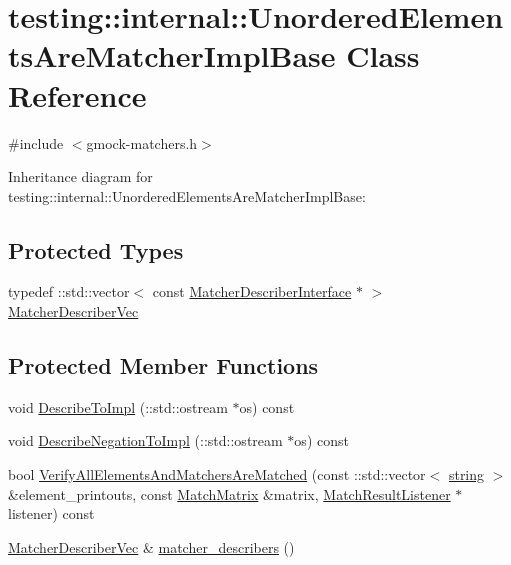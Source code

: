 \hypertarget{classtesting_1_1internal_1_1_unordered_elements_are_matcher_impl_base}{}\section{testing\+:\+:internal\+:\+:Unordered\+Elements\+Are\+Matcher\+Impl\+Base Class Reference}
\label{classtesting_1_1internal_1_1_unordered_elements_are_matcher_impl_base}


{\ttfamily \#include $<$gmock-\/matchers.\+h$>$}



Inheritance diagram for testing\+:\+:internal\+:\+:Unordered\+Elements\+Are\+Matcher\+Impl\+Base\+:
\subsection*{Protected Types}
\begin{DoxyCompactItemize}
\item 
typedef \+::std\+::vector$<$ const \hyperlink{classtesting_1_1_matcher_describer_interface}{Matcher\+Describer\+Interface} $\ast$ $>$ \hyperlink{classtesting_1_1internal_1_1_unordered_elements_are_matcher_impl_base_a81ca7ce793d4b25ce2a7d3e28b48cd64}{Matcher\+Describer\+Vec}
\end{DoxyCompactItemize}
\subsection*{Protected Member Functions}
\begin{DoxyCompactItemize}
\item 
void \hyperlink{classtesting_1_1internal_1_1_unordered_elements_are_matcher_impl_base_a025abc723fc4f2788c81eb1eca3838e9}{Describe\+To\+Impl} (\+::std\+::ostream $\ast$os) const 
\item 
void \hyperlink{classtesting_1_1internal_1_1_unordered_elements_are_matcher_impl_base_a40998516ce516b79f99db299c58b8231}{Describe\+Negation\+To\+Impl} (\+::std\+::ostream $\ast$os) const 
\item 
bool \hyperlink{classtesting_1_1internal_1_1_unordered_elements_are_matcher_impl_base_a0a12446ecc8fab75a551a77c322e7896}{Verify\+All\+Elements\+And\+Matchers\+Are\+Matched} (const \+::std\+::vector$<$ \hyperlink{namespacetesting_1_1internal_a8e8ff5b11e64078831112677156cb111}{string} $>$ \&element\+\_\+printouts, const \hyperlink{classtesting_1_1internal_1_1_match_matrix}{Match\+Matrix} \&matrix, \hyperlink{classtesting_1_1_match_result_listener}{Match\+Result\+Listener} $\ast$listener) const 
\item 
\hyperlink{classtesting_1_1internal_1_1_unordered_elements_are_matcher_impl_base_a81ca7ce793d4b25ce2a7d3e28b48cd64}{Matcher\+Describer\+Vec} \& \hyperlink{classtesting_1_1internal_1_1_unordered_elements_are_matcher_impl_base_a04d4adc809d9c06331f8dbb67b879ac0}{matcher\+\_\+describers} ()
\end{DoxyCompactItemize}
